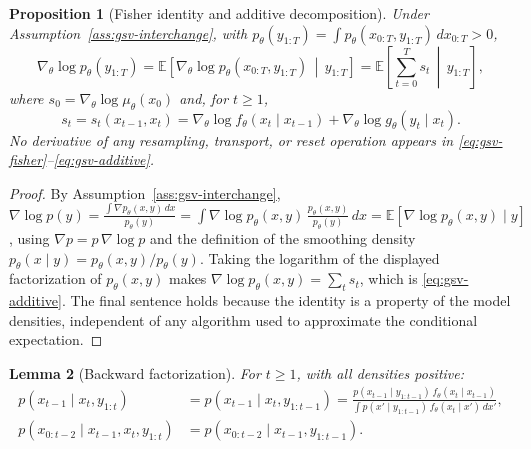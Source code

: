 \documentclass[11pt]{article}
\newtheorem{proposition}{Proposition}[section]
\newtheorem{lemma}[proposition]{Lemma}
\theoremstyle{definition}
\theoremstyle{remark}
\begin{document}
\begin{proposition}[Fisher identity and additive decomposition]
\label{prop:gsv-fisher-identity}
Under Assumption~\ref{ass:gsv-interchange}, with
$p_\theta(y_{1:T})=\int p_\theta(x_{0:T},y_{1:T})\,dx_{0:T}>0$,
\begin{equation}
\label{eq:gsv-fisher}
 \nabla_\theta\log p_\theta(y_{1:T})
 =\mathbb{E}\!\left[\nabla_\theta\log p_\theta(x_{0:T},y_{1:T})
 \,\middle|\,y_{1:T}\right]
 =\mathbb{E}\!\left[\sum_{t=0}^{T}s_t\,\middle|\,y_{1:T}\right],
\end{equation}
where $s_0=\nabla_\theta\log\mu_\theta(x_0)$ and, for $t\ge1$,
\begin{equation}
\label{eq:gsv-additive}
 s_t=s_t(x_{t-1},x_t)
 =\nabla_\theta\log f_\theta(x_t\mid x_{t-1})
 +\nabla_\theta\log g_\theta(y_t\mid x_t).
\end{equation}
No derivative of any resampling, transport, or reset operation appears in
\eqref{eq:gsv-fisher}--\eqref{eq:gsv-additive}.
\end{proposition}

\begin{proof}
By Assumption~\ref{ass:gsv-interchange},
$\nabla\log p(y)
=\frac{\int\nabla p_\theta(x,y)\,dx}{p_\theta(y)}
=\int\nabla\log p_\theta(x,y)\,
 \frac{p_\theta(x,y)}{p_\theta(y)}\,dx
=\mathbb{E}[\nabla\log p_\theta(x,y)\mid y]$,
using $\nabla p=p\,\nabla\log p$ and the definition of the smoothing density
$p_\theta(x\mid y)=p_\theta(x,y)/p_\theta(y)$.  Taking the logarithm of the
displayed factorization of $p_\theta(x,y)$ makes
$\nabla\log p_\theta(x,y)=\sum_{t}s_t$, which is
\eqref{eq:gsv-additive}.  The final sentence holds because the identity is a
property of the model densities, independent of any algorithm used to
approximate the conditional expectation.
\end{proof}

\begin{lemma}[Backward factorization]
\label{lem:gsv-backward-kernel}
For $t\ge1$, with all densities positive:
\begin{align}
 p(x_{t-1}\mid x_t,y_{1:t})
 &=p(x_{t-1}\mid x_t,y_{1:t-1})
 =\frac{p(x_{t-1}\mid y_{1:t-1})\,f_\theta(x_t\mid x_{t-1})}
        {\int p(x'\mid y_{1:t-1})\,f_\theta(x_t\mid x')\,dx'} ,
 \label{eq:gsv-backward-kernel}\\
 p(x_{0:t-2}\mid x_{t-1},x_t,y_{1:t})
 &=p(x_{0:t-2}\mid x_{t-1},y_{1:t-1}).
 \label{eq:gsv-past-independence}
\end{align}
\end{lemma}
\end{document}
